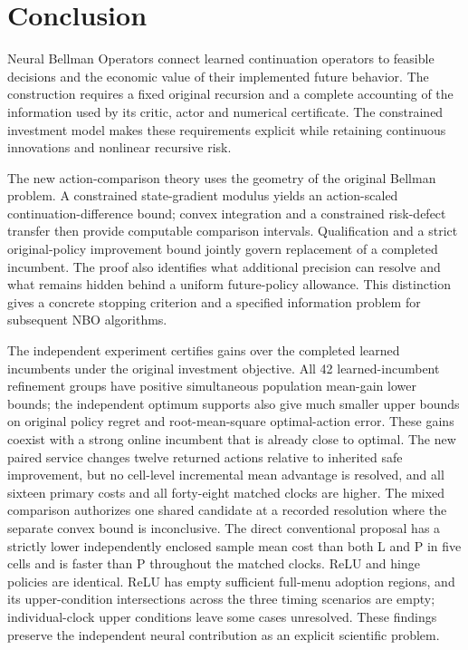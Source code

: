\section{Conclusion}\label{sec:conclusion120}
Neural Bellman Operators connect learned continuation operators to feasible
decisions and the economic value of their implemented future behavior. The
construction requires a fixed original recursion and a complete accounting of
the information used by its critic, actor and numerical certificate. The
constrained investment model makes these requirements explicit while retaining
continuous innovations and nonlinear recursive risk.

The new action-comparison theory uses the geometry of the original Bellman
problem. A constrained state-gradient modulus yields an action-scaled
continuation-difference bound; convex integration and a constrained risk-defect
transfer then provide computable comparison intervals. Qualification and a
strict original-policy improvement bound jointly govern replacement of a
completed incumbent. The proof also identifies what additional precision can
resolve and what remains hidden behind a uniform future-policy allowance. This
distinction gives a concrete stopping criterion and a specified information
problem for subsequent NBO algorithms.

The independent experiment certifies gains over the completed learned
incumbents under the original investment objective. All 42 learned-incumbent
refinement groups have positive simultaneous population mean-gain lower bounds;
the independent optimum supports also give much smaller upper bounds on
original policy regret and root-mean-square optimal-action error. These gains coexist with a
strong online incumbent that is already close to optimal. The new paired
service changes twelve returned actions relative to inherited safe improvement,
but no cell-level incremental mean advantage is resolved, and all sixteen
primary costs and all forty-eight matched clocks are higher. The mixed
comparison authorizes one shared candidate at a recorded resolution where
the separate convex bound is inconclusive. The direct conventional proposal
has a strictly lower independently enclosed sample mean cost than both L and P
in five cells and is faster than P throughout the matched clocks. ReLU and
hinge policies are identical. ReLU has empty sufficient full-menu adoption
regions, and its upper-condition intersections across the three timing
scenarios are empty; individual-clock upper conditions leave some cases
unresolved. These findings preserve the independent neural contribution as an
explicit scientific problem.

